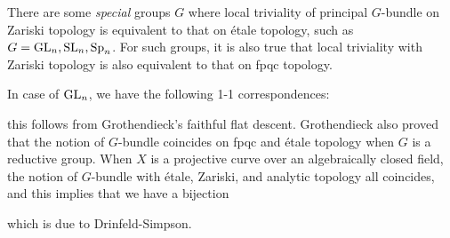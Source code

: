 There are some \emph{special} groups $G$ where local triviality of principal $G$-bundle on Zariski topology is equivalent to
that on \'etale topology, such as $G = \operatorname{\mathrm{GL}}_n, \operatorname{\mathrm{SL}}_n, \mathrm{Sp}_n$.
For such groups, it is also true that local triviality with Zariski topology is also equivalent to that on fpqc topology.

In case of $\operatorname{\mathrm{GL}}_n$, we have the following 1-1 correspondences:
\begin{center}
\end{center}
this follows from Grothendieck's faithful flat descent.
Grothendieck also proved that the notion of $G$-bundle coincides on fpqc and \'etale topology
when $G$ is a reductive group.
When $X$ is a projective curve over an algebraically closed field, the notion of $G$-bundle with \'etale, Zariski, and analytic topology all coincides, and this implies that
we have a bijection
\begin{center}
\end{center}
which is due to Drinfeld-Simpson.



